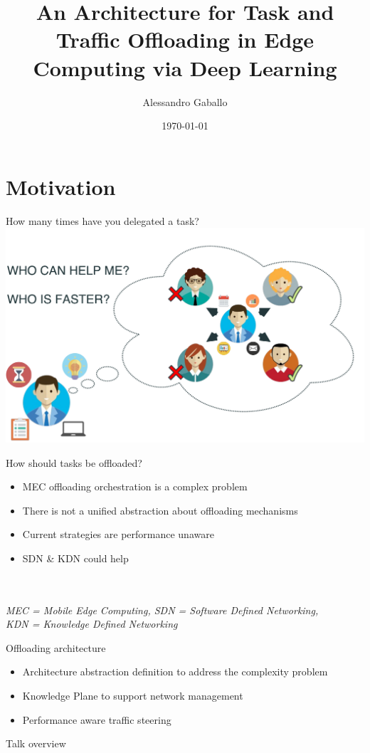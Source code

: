 \documentclass{beamer}
\title{An Architecture for Task and Traffic Offloading in Edge Computing via Deep Learning}
\date{\today}
\author{Alessandro Gaballo}
\institute{Supervisor: Flavio Esposito - Saint Louis University}
\begin{document}
\maketitle
\section*{Motivation}
  \begin{frame}{How many times have you delegated a task?}
	\includegraphics[width=\textwidth]{img/delegation.pdf}  
  \end{frame}
  \begin{frame}{How should tasks be offloaded?}
    \begin{itemize}
    	\item MEC offloading orchestration is a complex problem
    	\item There is not a unified abstraction about offloading mechanisms
    	\item Current strategies are performance unaware
    	\item SDN \& KDN could help
    \end{itemize}
    \footnotesize{\textit{\\~\\MEC = Mobile Edge Computing, SDN = Software Defined Networking,\\KDN = Knowledge Defined Networking}}
  \end{frame}
  \begin{frame}{Offloading architecture}
	\begin{itemize}
		\item Architecture abstraction definition to address the complexity problem
		\item Knowledge Plane to support network management
		\item Performance aware traffic steering
	\end{itemize}
  \end{frame}
  \begin{frame}{Talk overview}
	\tableofcontents[hideallsubsections]
  \end{frame}
\end{document}

